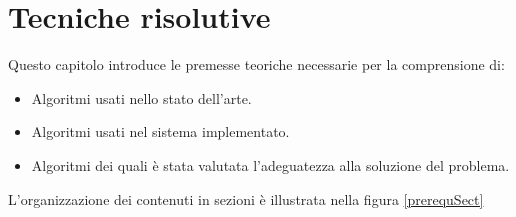 \chapter{Tecniche risolutive}
\label{capitolo:preliminari:ulteriori}



Questo capitolo introduce le premesse teoriche necessarie per la comprensione di: 
\begin{itemize}
  \item 
    Algoritmi usati nello stato dell'arte.
  \item
    Algoritmi usati nel sistema implementato.
  \item
    Algoritmi dei quali \`e stata valutata l'adeguatezza alla soluzione del problema.
\end{itemize}

L'organizzazione dei contenuti in sezioni \`e illustrata nella figura \ref{prerequSect}




